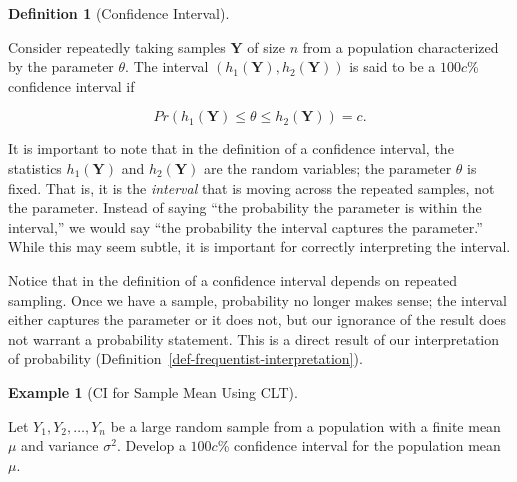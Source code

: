 \documentclass[
  letterpaper,
  DIV=11,
  numbers=noendperiod]{scrreprt}
\theoremstyle{definition}
\newtheorem{definition}{Definition}[chapter]
\theoremstyle{plain}
\theoremstyle{definition}
\newtheorem{example}{Example}[chapter]
\theoremstyle{remark}
\begin{document}
\begin{definition}[Confidence
Interval]\protect\hypertarget{def-confidence-interval}{}\label{def-confidence-interval}

Consider repeatedly taking samples \(\mathbf{Y}\) of size \(n\) from a
population characterized by the parameter \(\theta\). The interval
\(\left(h_1(\mathbf{Y}), h_2(\mathbf{Y})\right)\) is said to be a
\(100c\)\% confidence interval if

\[Pr\left(h_1(\mathbf{Y}) \leq \theta \leq h_2(\mathbf{Y})\right) = c.\]

\end{definition}

\begin{tcolorbox}[enhanced jigsaw, rightrule=.15mm, leftrule=.75mm, opacityback=0, coltitle=black, bottomrule=.15mm, opacitybacktitle=0.6, left=2mm, colframe=quarto-callout-warning-color-frame, breakable, colback=white, arc=.35mm, toprule=.15mm, toptitle=1mm, bottomtitle=1mm, title=\textcolor{quarto-callout-warning-color}{\faExclamationTriangle}\hspace{0.5em}{Warning}, titlerule=0mm, colbacktitle=quarto-callout-warning-color!10!white]

It is important to note that in the definition of a confidence interval,
the statistics \(h_1(\mathbf{Y})\) and \(h_2(\mathbf{Y})\) are the
random variables; the parameter \(\theta\) is fixed. That is, it is the
\emph{interval} that is moving across the repeated samples, not the
parameter. Instead of saying ``the probability the parameter is within
the interval,'' we would say ``the probability the interval captures the
parameter.'' While this may seem subtle, it is important for correctly
interpreting the interval.

\end{tcolorbox}

Notice that in the definition of a confidence interval depends on
repeated sampling. Once we have a sample, probability no longer makes
sense; the interval either captures the parameter or it does not, but
our ignorance of the result does not warrant a probability statement.
This is a direct result of our interpretation of probability
(Definition~\ref{def-frequentist-interpretation}).

\begin{example}[CI for Sample Mean Using
CLT]\protect\hypertarget{exm-ci-clt}{}\label{exm-ci-clt}

Let \(Y_1, Y_2, \dotsc, Y_n\) be a large random sample from a population
with a finite mean \(\mu\) and variance \(\sigma^2\). Develop a
\(100c\)\% confidence interval for the population mean \(\mu\).

\end{example}
\end{document}
